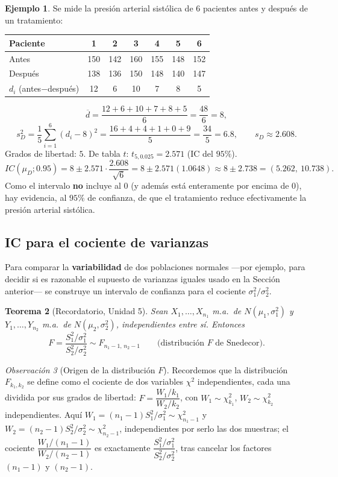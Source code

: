 \documentclass[11pt,a4paper]{article}
\theoremstyle{plain}
\newtheorem{teorema}{Teorema}[section]
\theoremstyle{definition}
\newtheorem{ejemplo}[teorema]{Ejemplo}
\theoremstyle{remark}
\newtheorem{observacion}[teorema]{Observación}
\begin{document}
\begin{ejemplo}
Se mide la presión arterial sistólica de $6$ pacientes antes y después de un tratamiento:
\begin{center}
\begin{tabular}{lcccccc}
\toprule
Paciente & 1 & 2 & 3 & 4 & 5 & 6 \\
\midrule
Antes & 150 & 142 & 160 & 155 & 148 & 152 \\
Después & 138 & 136 & 150 & 148 & 140 & 147 \\
\midrule
$d_i$ (antes$-$después) & 12 & 6 & 10 & 7 & 8 & 5 \\
\bottomrule
\end{tabular}
\end{center}
\[
\overline d = \frac{12+6+10+7+8+5}{6} = \frac{48}{6}=8,
\]
\[
s_D^2 = \frac{1}{5}\sum_{i=1}^6 (d_i-8)^2 = \frac{16+4+4+1+0+9}{5}=\frac{34}{5}=6.8, \qquad s_D\approx 2.608.
\]
Grados de libertad: $5$. De tabla $t$: $t_{5,0.025}=2.571$ (IC del $95\%$).
\[
IC(\mu_D;0.95) = 8 \pm 2.571\cdot\frac{2.608}{\sqrt 6} = 8\pm 2.571(1.0648) \approx 8\pm 2.738 = (5.262,\ 10.738).
\]
Como el intervalo \textbf{no} incluye al $0$ (y además está enteramente por encima de $0$), hay evidencia, al $95\%$ de confianza, de que el tratamiento reduce efectivamente la presión arterial sistólica.
\end{ejemplo}

\subsection{IC para el cociente de varianzas}
\label{sec:cocientevar}

Para comparar la \textbf{variabilidad} de dos poblaciones normales —por ejemplo, para decidir si es razonable el supuesto de varianzas iguales usado en la Sección anterior— se construye un intervalo de confianza para el cociente $\sigma_1^2/\sigma_2^2$.

\begin{teorema}[Recordatorio, Unidad 5]
Sean $X_1,\dots,X_{n_1}$ m.a.\ de $N(\mu_1,\sigma_1^2)$ y $Y_1,\dots,Y_{n_2}$ m.a.\ de $N(\mu_2,\sigma_2^2)$, independientes entre sí. Entonces
\[
F = \frac{S_1^2/\sigma_1^2}{S_2^2/\sigma_2^2} \sim F_{n_1-1,\,n_2-1} \qquad \text{(distribución $F$ de Snedecor).}
\]
\end{teorema}

\begin{observacion}[Origen de la distribución $F$]
Recordemos que la distribución $F_{k_1,k_2}$ se define como el cociente de dos variables $\chi^2$ independientes, cada una dividida por sus grados de libertad: $F=\dfrac{W_1/k_1}{W_2/k_2}$, con $W_1\sim\chi^2_{k_1}$, $W_2\sim\chi^2_{k_2}$ independientes. Aquí $W_1=(n_1-1)S_1^2/\sigma_1^2\sim\chi^2_{n_1-1}$ y $W_2=(n_2-1)S_2^2/\sigma_2^2\sim\chi^2_{n_2-1}$, independientes por serlo las dos muestras; el cociente $\dfrac{W_1/(n_1-1)}{W_2/(n_2-1)}$ es exactamente $\dfrac{S_1^2/\sigma_1^2}{S_2^2/\sigma_2^2}$, tras cancelar los factores $(n_1-1)$ y $(n_2-1)$.
\end{observacion}
\end{document}
